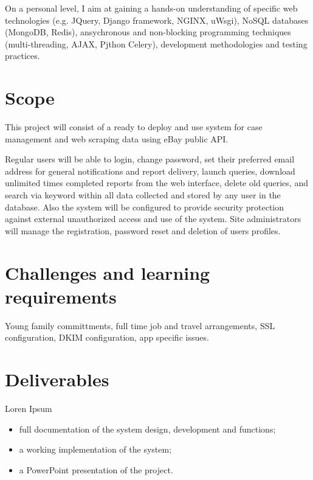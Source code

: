 On a personal level, I aim at gaining a hands-on understanding of specific web
technologies (e.g. JQuery, Django framework, NGINX, uWsgi), NoSQL databases
(MongoDB, Redis), ansychronous and non-blocking programming techniques
(multi-threading, AJAX, Pjthon Celery), development methodologies and testing
practices.


\section{Scope}
This project will consist of a ready to deploy and use system for case
management and web scraping data using eBay public API.

Regular users will be able to login, change password, set their preferred email
address for general notifications and report delivery, launch queries, download unlimited times
completed reports from the web interface, delete old queries, and search via
keyword within all data collected and stored by any user in the database. Also
the system will be configured to provide security protection against external
unauthorized access and use of the system. Site administrators will manage the
registration, password reset and deletion of users profiles.


\section{Challenges and learning requirements}
Young family committments, full time job and travel arrangements, SSL
configuration, DKIM configuration, app specific issues.


\section{Deliverables}
Loren Ipsum

\begin{itemize}
  \item full documentation of the system design, development and functions;
  \item a working implementation of the system;
  \item a PowerPoint presentation of the project.
\end{itemize}

